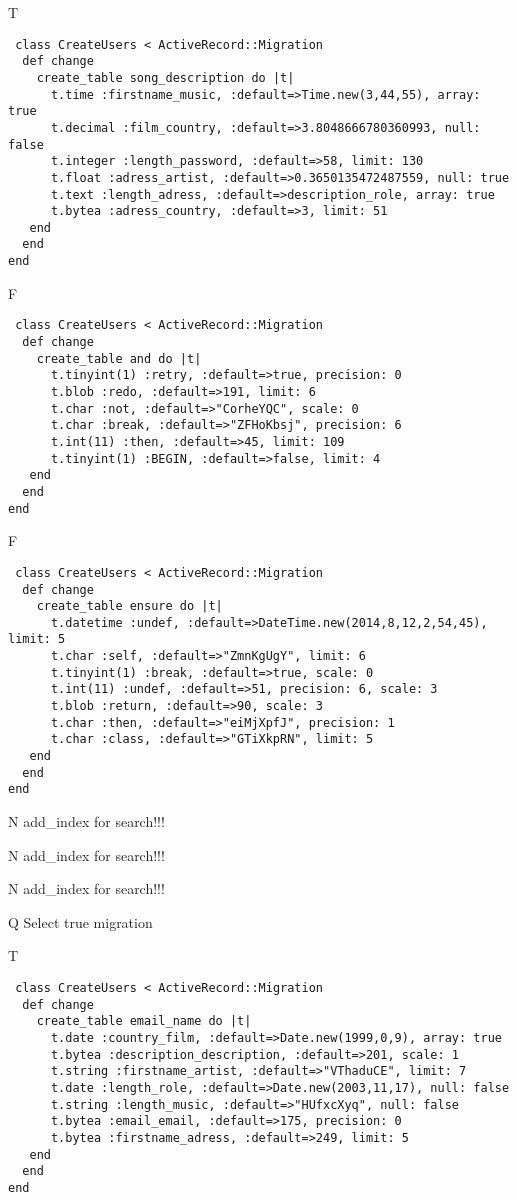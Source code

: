T
\begin{verbatim}
 class CreateUsers < ActiveRecord::Migration 
  def change 
    create_table song_description do |t| 
      t.time :firstname_music, :default=>Time.new(3,44,55), array: true
      t.decimal :film_country, :default=>3.8048666780360993, null: false
      t.integer :length_password, :default=>58, limit: 130
      t.float :adress_artist, :default=>0.3650135472487559, null: true
      t.text :length_adress, :default=>description_role, array: true
      t.bytea :adress_country, :default=>3, limit: 51
   end 
  end 
end
\end{verbatim}

F
\begin{verbatim}
 class CreateUsers < ActiveRecord::Migration 
  def change 
    create_table and do |t| 
      t.tinyint(1) :retry, :default=>true, precision: 0
      t.blob :redo, :default=>191, limit: 6
      t.char :not, :default=>"CorheYQC", scale: 0
      t.char :break, :default=>"ZFHoKbsj", precision: 6
      t.int(11) :then, :default=>45, limit: 109
      t.tinyint(1) :BEGIN, :default=>false, limit: 4
   end 
  end 
end
\end{verbatim}

F
\begin{verbatim}
 class CreateUsers < ActiveRecord::Migration 
  def change 
    create_table ensure do |t| 
      t.datetime :undef, :default=>DateTime.new(2014,8,12,2,54,45), limit: 5
      t.char :self, :default=>"ZmnKgUgY", limit: 6
      t.tinyint(1) :break, :default=>true, scale: 0
      t.int(11) :undef, :default=>51, precision: 6, scale: 3
      t.blob :return, :default=>90, scale: 3
      t.char :then, :default=>"eiMjXpfJ", precision: 1
      t.char :class, :default=>"GTiXkpRN", limit: 5
   end 
  end 
end
\end{verbatim}
N
add_index for search!!!
  
N
add_index for search!!!
  
N
add_index for search!!!
  
Q
Select true migration

T
\begin{verbatim}
 class CreateUsers < ActiveRecord::Migration 
  def change 
    create_table email_name do |t| 
      t.date :country_film, :default=>Date.new(1999,0,9), array: true
      t.bytea :description_description, :default=>201, scale: 1
      t.string :firstname_artist, :default=>"VThaduCE", limit: 7
      t.date :length_role, :default=>Date.new(2003,11,17), null: false
      t.string :length_music, :default=>"HUfxcXyq", null: false
      t.bytea :email_email, :default=>175, precision: 0
      t.bytea :firstname_adress, :default=>249, limit: 5
   end 
  end 
end
\end{verbatim}

